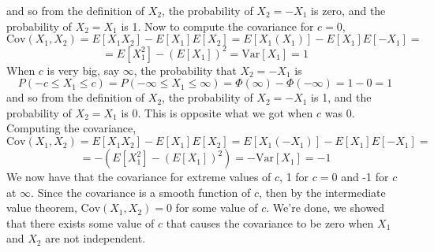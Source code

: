and so from the definition of $X_2$, the probability of $X_2 = -X_1$ is zero, and the probability of $X_2 = X_1$ is 1. Now to compute the covariance for $c = 0$,
\[
    \text{Cov}(X_1, X_2)
    =
    E[X_1 X_2]
    -
    E[X_1] E[X_2]
    =
    E[X_1 (X_1)]
    -
    E[X_1] E[-X_1]
    =
\]
\[
    =
    E[X_1^2]
    -
    {(E[X_1])}^{2}
    =
    \text{Var}[X_1] = 1
\]
When $c$ is very big, say $\infty$, the probability that $X_2 = -X_1$ is
\[
    P(-c \leq X_1 \leq c)
    =
    P(-\infty \leq X_1 \leq \infty)
    =
    \Phi (\infty) - \Phi(-\infty)
    =
    1 - 0
    =
    1
\]
and so from the definition of $X_2$, the probability of $X_2 = -X_1$ is 1, and the probability of $X_2 = X_1$ is 0. This is opposite what we got when $c$ was 0. Computing the covariance,
\[
    \text{Cov}(X_1, X_2)
    =
    E[X_1 X_2]
    -
    E[X_1] E[X_2]
    =
    E[X_1 (-X_1)]
    -
    E[X_1] E[-X_1]
    =
\]
\[
    =
    -
    \left(
    E[X_1^2]
    -
    {(E[X_1])}^{2}
    \right)
    =
    -
    \text{Var}[X_1]
    =
    -1
\]
We now have that the covariance for extreme values of $c$, 1 for $c = 0$ and -1 for $c$ at $\infty$. Since the covariance is a smooth function of $c$, then by the intermediate value theorem, $\text{Cov}(X_1, X_2) = 0$ for some value of $c$. We're done, we showed that there exists some value of $c$ that causes the covariance to be zero when $X_1$ and $X_2$ are not independent.